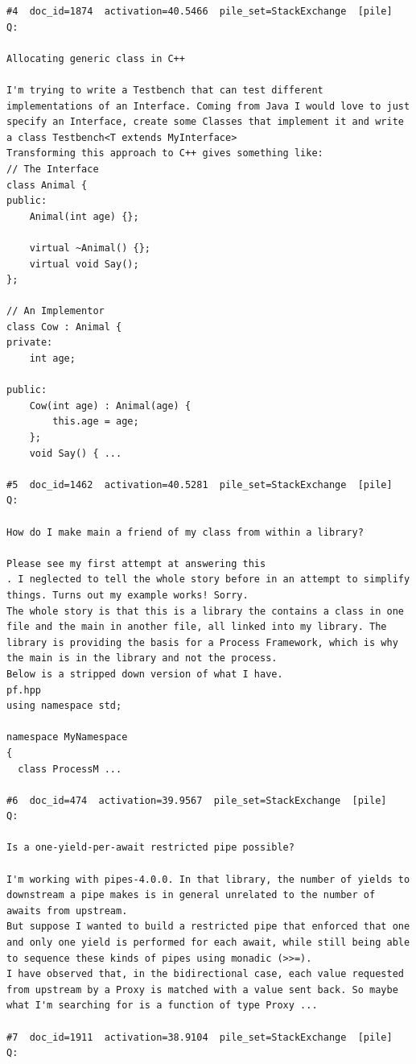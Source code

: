\begin{verbatim}
#4  doc_id=1874  activation=40.5466  pile_set=StackExchange  [pile]
Q:

Allocating generic class in C++

I'm trying to write a Testbench that can test different implementations of an Interface. Coming from Java I would love to just specify an Interface, create some Classes that implement it and write a class Testbench<T extends MyInterface>
Transforming this approach to C++ gives something like:
// The Interface
class Animal {
public:
    Animal(int age) {};

    virtual ~Animal() {};
    virtual void Say();
};

// An Implementor
class Cow : Animal {
private:
    int age;

public:
    Cow(int age) : Animal(age) {
        this.age = age;
    };
    void Say() { ...

#5  doc_id=1462  activation=40.5281  pile_set=StackExchange  [pile]
Q:

How do I make main a friend of my class from within a library?

Please see my first attempt at answering this
. I neglected to tell the whole story before in an attempt to simplify things. Turns out my example works! Sorry.
The whole story is that this is a library the contains a class in one file and the main in another file, all linked into my library. The library is providing the basis for a Process Framework, which is why the main is in the library and not the process.
Below is a stripped down version of what I have.
pf.hpp
using namespace std;

namespace MyNamespace
{
  class ProcessM ...

#6  doc_id=474  activation=39.9567  pile_set=StackExchange  [pile]
Q:

Is a one-yield-per-await restricted pipe possible?

I'm working with pipes-4.0.0. In that library, the number of yields to downstream a pipe makes is in general unrelated to the number of awaits from upstream.
But suppose I wanted to build a restricted pipe that enforced that one and only one yield is performed for each await, while still being able to sequence these kinds of pipes using monadic (>>=).
I have observed that, in the bidirectional case, each value requested from upstream by a Proxy is matched with a value sent back. So maybe what I'm searching for is a function of type Proxy ...

#7  doc_id=1911  activation=38.9104  pile_set=StackExchange  [pile]
Q:


\end{verbatim}
